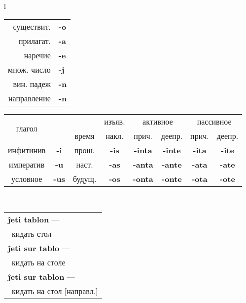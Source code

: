 \documentclass{article}
\def\b#1{\textbf{#1}}
\def\g{\cellcolor{gray!25}}
\begin{document}
\begin{center}
\begin{tabular}{l}
\begin{tabular}{|r>{\bfseries}l|}
\hline
существит. & -o \\
прилагат. & -a \\
наречие & -e \\
множ. число & -j \\
вин. падеж & -n \\
направление & -n \\
\hline
\end{tabular}
\quad
\begin{tabular}{|cc|c|c|c|c|c|c|}
\hline
\multirow{2}{*}{глагол} & &\g &\g изъяв. &\multicolumn{2}{c|}{\g активное} & \multicolumn{2}{c|}{\g пассивное} \\
\cline{5-8}
& & \g время & \g накл. & \g прич. & \g деепр. & \g прич. & \g деепр. \\
\hline
инфитинив & \b{-i} & \g прош. & \b{-is} & \b{-inta} & \b{-inte} & \b{-ita} & \b{-ite} \\
\cline{3-8}
императив & \b{-u} & \g наст. & \b{-as} & \b{-anta} & \b{-ante} & \b{-ata} & \b{-ate} \\
\cline{3-8}
условное & \b{-us} & \g будущ. & \b{-os} & \b{-onta} & \b{-onte} & \b{-ota} & \b{-ote} \\
\hline
\end{tabular}
\,
\begin{tabular}{l}
\b{ĵeti tablon} ---\\
~кидать стол\\
\b{ĵeti sur tablo} ---\\
~кидать на столе\\
\b{ĵeti sur tablon} ---\\
~кидать на стол [направл.]\\
\end{tabular}
\vspace{0.2em}\\


\end{tabular}
\end{center}
\end{document}
